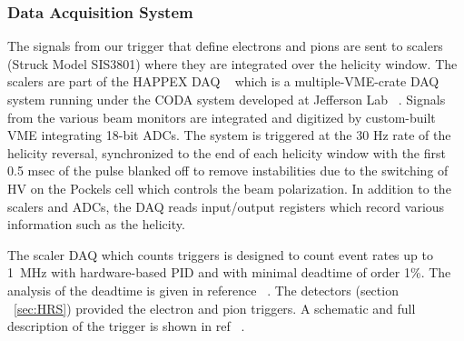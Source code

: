 \subsubsection{Data Acquisition System}
\label{sec:daq}

The signals from our trigger that define electrons and 
pions are sent to scalers (Struck Model SIS3801)
where they are integrated over the helicity window.  
The scalers are part of the HAPPEX DAQ ~\cite{HAPPEXsff}
which is a multiple-VME-crate DAQ system running under the CODA system
developed at Jefferson Lab ~\cite{CODA}.  
Signals from the various beam monitors 
are integrated and digitized by custom-built 
VME integrating 18-bit ADCs.  The system is
triggered at the 30 Hz rate of the helicity reversal,
synchronized to the end of each helicity window
with the first 0.5 msec of the pulse 
blanked off to remove instabilities due to the switching of
HV on the Pockels cell which controls the beam polarization.
In addition to the scalers and ADCs, the DAQ reads
input/output registers which record various information 
such as the helicity.

The scaler DAQ which counts triggers is designed
to count event rates up to 1~MHz with hardware-based PID
and with minimal deadtime of order 1\%.  
The analysis
of the deadtime is given in reference ~\cite{pvdis-nim}.
The detectors (section ~\ref{sec:HRS})
provided the electron and pion triggers.  A schematic 
and full description of the
trigger is shown in ref ~\cite{pvdis-nim}.


